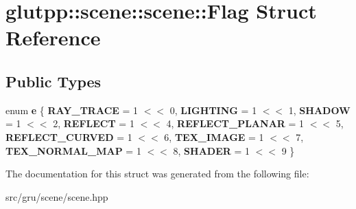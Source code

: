 \hypertarget{structglutpp_1_1scene_1_1scene_1_1Flag}{\section{glutpp\-:\-:scene\-:\-:scene\-:\-:\-Flag \-Struct \-Reference}
\label{structglutpp_1_1scene_1_1scene_1_1Flag}
}
\subsection*{\-Public \-Types}
\begin{DoxyCompactItemize}
\item 
enum {\bfseries e} \{ \*
{\bfseries \-R\-A\-Y\-\_\-\-T\-R\-A\-C\-E} =  1 $<$$<$ 0, 
{\bfseries \-L\-I\-G\-H\-T\-I\-N\-G} =  1 $<$$<$ 1, 
{\bfseries \-S\-H\-A\-D\-O\-W} =  1 $<$$<$ 2, 
{\bfseries \-R\-E\-F\-L\-E\-C\-T} =  1 $<$$<$ 4, 
\*
{\bfseries \-R\-E\-F\-L\-E\-C\-T\-\_\-\-P\-L\-A\-N\-A\-R} =  1 $<$$<$ 5, 
{\bfseries \-R\-E\-F\-L\-E\-C\-T\-\_\-\-C\-U\-R\-V\-E\-D} =  1 $<$$<$ 6, 
{\bfseries \-T\-E\-X\-\_\-\-I\-M\-A\-G\-E} =  1 $<$$<$ 7, 
{\bfseries \-T\-E\-X\-\_\-\-N\-O\-R\-M\-A\-L\-\_\-\-M\-A\-P} =  1 $<$$<$ 8, 
\*
{\bfseries \-S\-H\-A\-D\-E\-R} =  1 $<$$<$ 9
 \}
\end{DoxyCompactItemize}


\-The documentation for this struct was generated from the following file\-:\begin{DoxyCompactItemize}
\item 
src/gru/scene/scene.\-hpp\end{DoxyCompactItemize}
